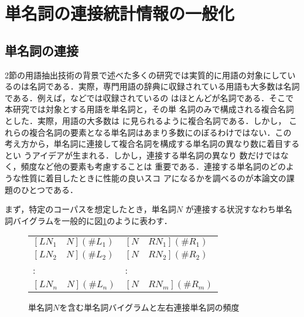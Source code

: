 \section{単名詞の連接統計情報の一般化}

\subsection{単名詞の連接}
2節の用語抽出技術の背景で述べた多くの研究では実質的に用語の対象にしてい
るのは名詞である．実際，専門用語の辞典に収録されている用語も大多数は名詞
である．例えば，\cite{densi,computer-sci,archi}などでは収録されているの
はほとんどが名詞である．そこで本研究では対象とする用語を単名詞と，その単
名詞のみで構成される複合名詞とした．実際，用語の大多数は
\cite{densi,computer-sci,archi}に見られるように複合名詞である．しかし，
これらの複合名詞の要素となる単名詞はあまり多数にのぼるわけではない．この
考え方から，単名詞に連接して複合名詞を構成する単名詞の異なり数に着目するとい
うアイデア\cite{NakagawaMori98}が生まれる．しかし，連接する単名詞の異なり
数だけではなく，頻度など他の要素も考慮することは
重要である．連接する単名詞のどのような性質に着目したときに性能の良いスコ
アになるかを調べるのが本論文の課題のひとつである．

まず，特定のコーパスを想定したとき，単名詞$N$ が連接する状況すなわち単名
詞バイグラムを一般的に図\ref{fig:1}のように表わす．

\begin{figure}[htbp]
\hspace*{\fill}
\begin{tabular}{ll}
$[LN_1 \hspace{1em} N] (\#L_1)$ &               $[N \hspace{1em} RN_1](\#R_1)$\\
$[LN_2 \hspace{1em} N] (\#L_2)$ &               $[N \hspace{1em} RN_2](\#R_2)$\\
:              &                        :    \\
$[LN_n \hspace{1em} N] (\#L_n)$ &               $[N \hspace{1em} RN_m](\#R_m)$\\
\end{tabular}
\hspace*{\fill}
\caption{単名詞$N$を含む単名詞バイグラムと左右連接単名詞の頻度}
\label{fig:1}
\end{figure}

